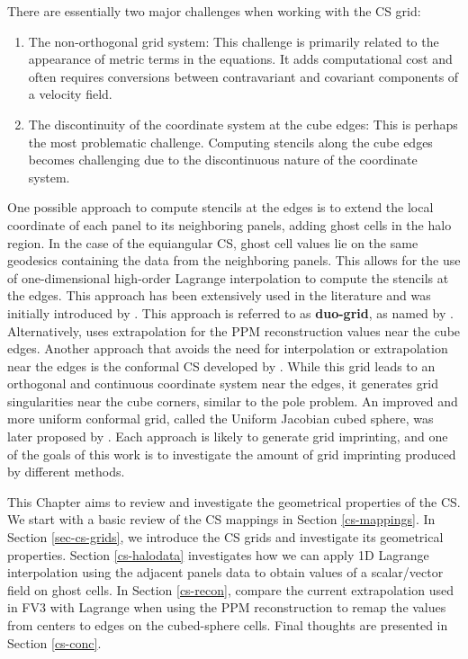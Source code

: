 There are essentially two major challenges when working with the CS grid:
\begin{enumerate}
\item
The non-orthogonal grid system: This challenge is primarily related to the appearance of
metric terms in the equations. It adds computational cost and often requires conversions
between contravariant and covariant components of a velocity field.
\item
The discontinuity of the coordinate system at the cube edges: This is perhaps the most 
problematic challenge. Computing stencils along the cube edges becomes challenging due to 
the discontinuous nature of the coordinate system.
\end{enumerate}
One possible approach to compute stencils at the edges is to extend the local coordinate 
of each panel to its neighboring panels, adding ghost cells in the halo region. In the 
case of the equiangular CS, ghost cell values lie on the same geodesics 
containing the data from the neighboring panels. This allows for the use of one-dimensional
high-order Lagrange interpolation to compute the stencils at the edges. 
This approach has been extensively used in the literature \citep{croisille:2013, 
katta:2015, katta:2015b, chen:2021} and was initially introduced by \citet{ronchi:1996}.
This approach is referred to as \textbf{duo-grid}, as named by \citet{chen:2021}.
Alternatively, \citet{putman:2007} uses extrapolation for the PPM reconstruction values near the cube edges.
Another approach that avoids the need for interpolation or extrapolation near the edges is 
the conformal CS developed by \citet{rancic:1996}. While this grid leads to an 
orthogonal and continuous coordinate system near the edges, it generates grid singularities
near the cube corners, similar to the pole problem. 
An improved and more uniform conformal grid, called the Uniform Jacobian cubed sphere, was 
later proposed by \citet{rancic:2017}.
Each approach is likely to generate grid imprinting, and one of the goals of this work is 
to investigate the amount of grid imprinting produced by different methods.

This Chapter aims to review and investigate the geometrical properties of the CS.
We start with a basic review of the CS mappings in Section \ref{cs-mappings}.
In Section \ref{sec-cs-grids}, we introduce the CS grids and investigate its geometrical properties.
Section \ref{cs-halodata} investigates how we can apply 1D Lagrange interpolation using the adjacent panels
data to obtain values of a scalar/vector field on ghost cells.
In Section \ref{cs-recon}, compare the current extrapolation used in FV3 with Lagrange when using the PPM reconstruction to
remap the values from centers to edges on the cubed-sphere cells.
Final thoughts are presented in Section \ref{cs-conc}.

